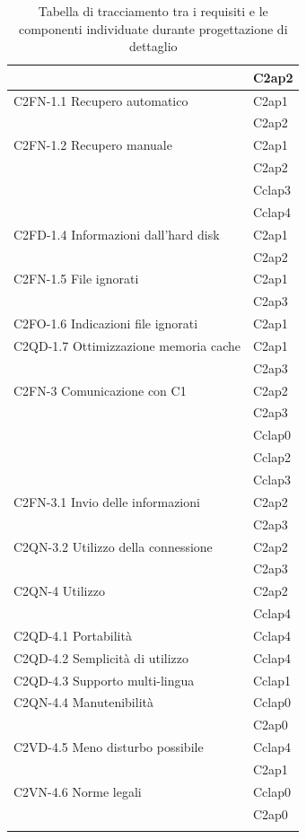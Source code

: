 \begin{footnotesize}
\begin{longtable}[!h]{|l|l|}
& C2ap2\\\hline  
C2FN-1.1 Recupero automatico &  C2ap1 \\
& C2ap2\\\hline
C2FN-1.2 Recupero manuale &  C2ap1\\
&  C2ap2 \\
&  Cclap3\\
&  Cclap4\\\hline  
C2FD-1.4 Informazioni dall'hard disk & C2ap1 \\
&  C2ap2\\\hline  
C2FN-1.5 File ignorati &  C2ap1\\    
&  C2ap3  \\\hline
C2FO-1.6 Indicazioni file ignorati &  C2ap1\\\hline 
C2QD-1.7 Ottimizzazione memoria cache &  C2ap1\\
&  C2ap3\\\hline
C2FN-3 Comunicazione con C1 &  C2ap2\\
&  C2ap3\\
&  Cclap0\\
&  Cclap2\\
&  Cclap3\\\hline      
C2FN-3.1 Invio delle informazioni &  C2ap2\\
&  C2ap3\\\hline
C2QN-3.2 Utilizzo della connessione &  C2ap2\\
&  C2ap3\\\hline   
C2QN-4 Utilizzo &  C2ap2\\
&  Cclap4 \\\hline  
C2QD-4.1 Portabilit\`a &  Cclap4\\\hline   
C2QD-4.2 Semplicit\`a di utilizzo  &  Cclap4\\\hline  
C2QD-4.3 Supporto multi-lingua &  Cclap1\\\hline  
C2QN-4.4 Manutenibilit\`a &  Cclap0\\
&  C2ap0\\\hline 
C2VD-4.5 Meno disturbo possibile  &  Cclap4 \\
&  C2ap1 \\\hline                          
C2VN-4.6 Norme legali &  Cclap0\\
&  C2ap0\\\hline   
\caption{Tabella di tracciamento tra i requisiti e le componenti individuate
durante progettazione di dettaglio}
\end{longtable}
\end{footnotesize}

